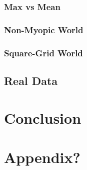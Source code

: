 \documentclass[10pt,twoside]{report}
\begin{document}
        \subsection{Max vs Mean}
        \subsection{Non-Myopic World}
        \subsection{Square-Grid World}
    \section{Real Data}

\chapter{Conclusion}\label{ref:conclusion}

\nocite{*}
\appendix

\chapter{Appendix?}



\end{document}
